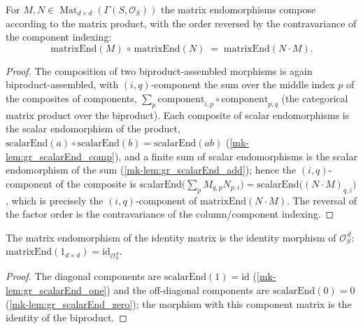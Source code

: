 \begin{lemma}\label{mk-lem:gr_matrixEnd_comp}
  \leanok

  For \(M, N \in \operatorname{Mat}_{d \times d}(\Gamma(S, \mathcal{O}_S))\) the matrix
  endomorphisms compose according to the matrix product, with the order reversed by
  the contravariance of the component indexing:
  \[
    \mathrm{matrixEnd}(M) \,\circ\, \mathrm{matrixEnd}(N)
      \;=\; \mathrm{matrixEnd}(N \cdot M).
  \]
\end{lemma}
\begin{proof}
  The composition of two biproduct-assembled morphisms is again biproduct-assembled,
  with \((i,q)\)-component the sum over the middle index \(p\) of the composites of
  components, \(\sum_p \mathrm{component}_{i,p} \circ \mathrm{component}_{p,q}\) (the
  categorical matrix product over the biproduct). Each composite of scalar
  endomorphisms is the scalar endomorphism of the product,
  \(\mathrm{scalarEnd}(a)\circ\mathrm{scalarEnd}(b) = \mathrm{scalarEnd}(ab)\)
  (\ref{mk-lem:gr_scalarEnd_comp}), and a finite sum of scalar endomorphisms is the
  scalar endomorphism of the sum (\ref{mk-lem:gr_scalarEnd_add}); hence the \((i,q)\)-component
  of the composite is \(\mathrm{scalarEnd}\bigl(\sum_p M_{q,p} N_{p,i}\bigr) =
  \mathrm{scalarEnd}\bigl((N\cdot M)_{q,i}\bigr)\), which is precisely the
  \((i,q)\)-component of \(\mathrm{matrixEnd}(N\cdot M)\). The reversal of the factor
  order is the contravariance of the column/component indexing.
\end{proof}

\begin{lemma}\label{mk-lem:gr_matrixEnd_one}
  \leanok

  The matrix endomorphism of the identity matrix is the identity morphism of
  \(\mathcal{O}_S^{\,d}\): \(\mathrm{matrixEnd}(1_{d\times d}) =
  \mathrm{id}_{\mathcal{O}_S^{\,d}}\).
\end{lemma}
\begin{proof}
  The diagonal components are \(\mathrm{scalarEnd}(1) = \mathrm{id}\)
  (\ref{mk-lem:gr_scalarEnd_one}) and the off-diagonal components are
  \(\mathrm{scalarEnd}(0) = 0\) (\ref{mk-lem:gr_scalarEnd_zero}); the morphism with this
  component matrix is the identity of the biproduct.
\end{proof}

